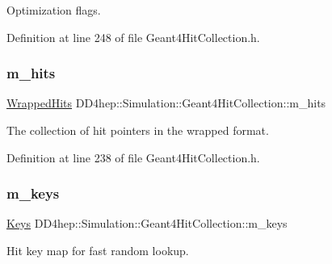 Optimization flags. 



Definition at line 248 of file Geant4\+Hit\+Collection.\+h.

\hypertarget{class_d_d4hep_1_1_simulation_1_1_geant4_hit_collection_a8a2e237f209928a1598ccf0b72cd3d44}{}\label{class_d_d4hep_1_1_simulation_1_1_geant4_hit_collection_a8a2e237f209928a1598ccf0b72cd3d44} 
\subsubsection{\texorpdfstring{m\+\_\+hits}{m\_hits}}
{\footnotesize\ttfamily \hyperlink{class_d_d4hep_1_1_simulation_1_1_geant4_hit_collection_ada2cbec73b2d5005b514a33b44a1dc05}{Wrapped\+Hits} D\+D4hep\+::\+Simulation\+::\+Geant4\+Hit\+Collection\+::m\+\_\+hits\hspace{0.3cm}{\ttfamily [protected]}}



The collection of hit pointers in the wrapped format. 



Definition at line 238 of file Geant4\+Hit\+Collection.\+h.

\hypertarget{class_d_d4hep_1_1_simulation_1_1_geant4_hit_collection_a3d45d2544cef7139ad425c2abc66c45a}{}\label{class_d_d4hep_1_1_simulation_1_1_geant4_hit_collection_a3d45d2544cef7139ad425c2abc66c45a} 
\subsubsection{\texorpdfstring{m\+\_\+keys}{m\_keys}}
{\footnotesize\ttfamily \hyperlink{class_d_d4hep_1_1_simulation_1_1_geant4_hit_collection_a0d4d87fb90cf83dceff0b43928426135}{Keys} D\+D4hep\+::\+Simulation\+::\+Geant4\+Hit\+Collection\+::m\+\_\+keys\hspace{0.3cm}{\ttfamily [protected]}}



Hit key map for fast random lookup. 



